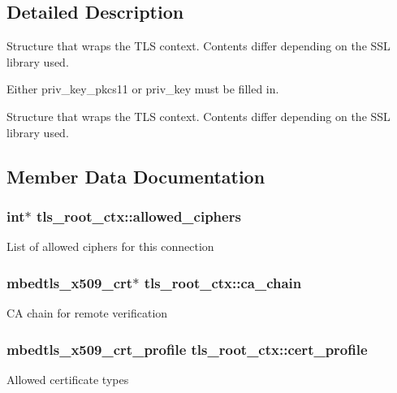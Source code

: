 \subsection{Detailed Description}
Structure that wraps the T\+L\+S context. Contents differ depending on the S\+S\+L library used.

Either {\ttfamily priv\+\_\+key\+\_\+pkcs11} or {\ttfamily priv\+\_\+key} must be filled in.

Structure that wraps the T\+L\+S context. Contents differ depending on the S\+S\+L library used. 

\subsection{Member Data Documentation}
\hypertarget{structtls__root__ctx_a8561171233831df2b135c5038660284a}{}
\subsubsection[{allowed\+\_\+ciphers}]{\setlength{\rightskip}{0pt plus 5cm}int$\ast$ tls\+\_\+root\+\_\+ctx\+::allowed\+\_\+ciphers}\label{structtls__root__ctx_a8561171233831df2b135c5038660284a}
List of allowed ciphers for this connection \hypertarget{structtls__root__ctx_a647982cddec0274b16b0376140cff607}{}
\subsubsection[{ca\+\_\+chain}]{\setlength{\rightskip}{0pt plus 5cm}mbedtls\+\_\+x509\+\_\+crt$\ast$ tls\+\_\+root\+\_\+ctx\+::ca\+\_\+chain}\label{structtls__root__ctx_a647982cddec0274b16b0376140cff607}
C\+A chain for remote verification \hypertarget{structtls__root__ctx_ab5662f92486fc6033d30b680f013a42e}{}
\subsubsection[{cert\+\_\+profile}]{\setlength{\rightskip}{0pt plus 5cm}mbedtls\+\_\+x509\+\_\+crt\+\_\+profile tls\+\_\+root\+\_\+ctx\+::cert\+\_\+profile}\label{structtls__root__ctx_ab5662f92486fc6033d30b680f013a42e}
Allowed certificate types \hypertarget{structtls__root__ctx_a03ca403f806d7d60d1b8f2d0d56d0e0d}{}
